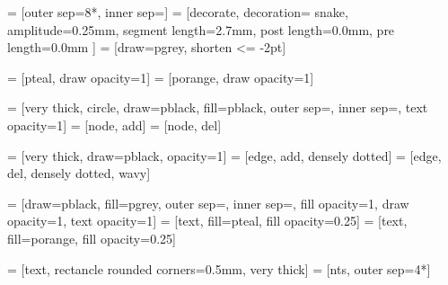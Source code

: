  = [outer sep=8*\nodespacing, inner sep=\nodesize]
 = [decorate,
                    decoration={%
                        snake,
                        amplitude=0.25mm,
                        segment length=2.7mm,
                        post length=0.0mm,
                        pre length=0.0mm
                    }]
 = [draw=pgrey, shorten <= -2pt]

 = [pteal, draw opacity=1]
 = [porange, draw opacity=1]

 = [very thick,
                    circle,
                    draw=pblack,
                    fill=pblack,
                    outer sep=\nodespacing,
                    inner sep=\nodesize,
                    text opacity=1]
 = [node, add]
 = [node, del]

 = [very thick, draw=pblack, opacity=1]
 = [edge, add, densely dotted]
 = [edge, del, densely dotted, wavy]

 = [draw=pblack,  %
                    fill=pgrey,
                    outer sep=\nodespacing,
                    inner sep=\nodesize,
                    fill opacity=1,
                    draw opacity=1,
                    text opacity=1]
 = [text, fill=pteal, fill opacity=0.25]
 = [text, fill=porange, fill opacity=0.25]

 = [text,
                   rectancle
                   rounded corners=0.5mm,
                   very thick]
 = [nts, outer sep=4*\nodespacing]
